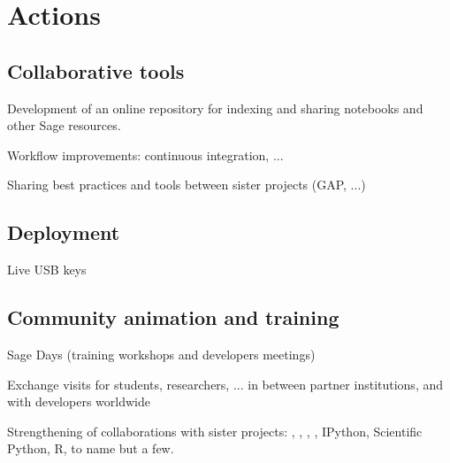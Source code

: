 
\section{Actions}
\subsection{Collaborative tools}

\begin{compactitem}
\item Development of an online repository for indexing and sharing
  notebooks and other Sage resources.
\item Workflow improvements: continuous integration, ...
\item Sharing best practices and tools between sister projects (GAP, ...)
\end{compactitem}

\subsection{Deployment}
\begin{compactitem}
\item Live USB keys
\end{compactitem}

\subsection{Community animation and training}

\begin{compactitem}
\item Sage Days (training workshops and developers meetings)
  \begin{compactitem}
  \item {}
  \end{compactitem}
\item Exchange visits for students, researchers, ... in between
  partner institutions, and with developers worldwide
\item Strengthening of collaborations with sister projects: \GAP,
  \Linbox, \Singular, \PariGP, IPython, Scientific Python, R, to name but a
  few.
\item {}
\end{compactitem}



